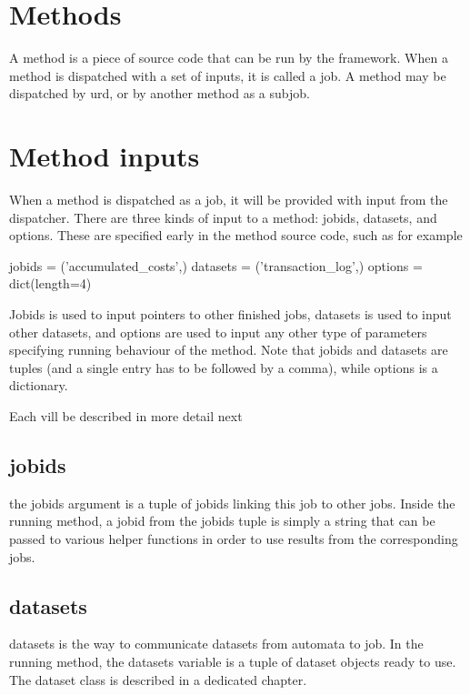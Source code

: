 \section{Methods}
A method is a piece of source code that can be run by the framework.
When a method is dispatched with a set of inputs, it is called a job.
A method may be dispatched by urd, or by another method as a subjob.

\section{Method inputs}

When a method is dispatched as a job, it will be provided with input
from the dispatcher.  There are three kinds of input to a method:
jobids, datasets, and options.  These are specified early in the
method source code, such as for example

\begin{python}
jobids = ('accumulated_costs',)
datasets = ('transaction_log',)
options = dict(length=4)
\end{python}

Jobids is used to input pointers to other finished jobs, datasets is
used to input other datasets, and options are used to input any other
type of parameters specifying running behaviour of the method.  Note
that jobids and datasets are tuples (and a single entry has to be
followed by a comma), while options is a dictionary.

Each vill be described in more detail next



\subsection{jobids}
the jobids argument is a tuple of jobids linking this job to other
jobs.  Inside the running method, a jobid from the jobids tuple is
simply a string that can be passed to various helper functions in
order to use results from the corresponding jobs.



\subsection{datasets}
datasets is the way to communicate datasets from automata to job.  In
the running method, the datasets variable is a tuple of dataset
objects ready to use.  The dataset class is described in a dedicated
chapter.

